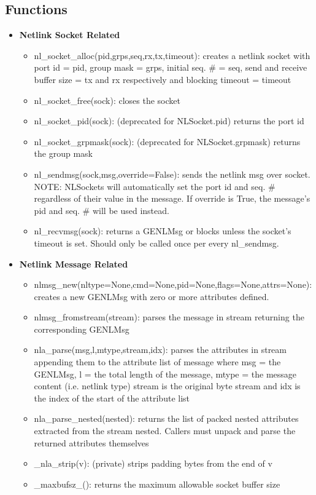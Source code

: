 \documentclass[11pt]{article}
\begin{document}
\begin{appendices}
\subsection{Functions}\label{sec:libnlfct}
\begin{itemize}
\item \textbf{Netlink Socket Related}
\begin{itemize}
\item nl\_socket\_alloc(pid,grps,seq,rx,tx,timeout): creates a netlink socket 
with port id = pid, group mask = grps, initial seq. \# = seq, send and receive
buffer size = tx and rx respectively and blocking timeout = timeout
\item nl\_socket\_free(sock): closes the socket
\item nl\_socket\_pid(sock): (deprecated for NLSocket.pid) returns the port id
\item nl\_socket\_grpmask(sock): (deprecated for NLSocket.grpmask) returns the 
group mask
\item nl\_sendmsg(sock,msg,override=False): sends the netlink msg over socket. 
NOTE: NLSockets will automatically set the port id and seq. \# regardless of 
their value in the message. If override is True, the message's pid and seq. \# 
will be used instead. 
\item nl\_recvmsg(sock): returns a GENLMsg or blocks unless the socket's timeout 
is set. Should only be called once per every nl\_sendmsg.
\end{itemize}
\item \textbf{Netlink Message Related}
\begin{itemize}
\item nlmsg\_new(nltype=None,cmd=None,pid=None,flags=None,attrs=None): creates a 
new GENLMsg with zero or more attributes defined. 
\item nlmsg\_fromstream(stream): parses the message in stream returning the
corresponding GENLMsg
\item nla\_parse(msg,l,mtype,stream,idx): parses the attributes in stream appending
them to the attribute list of message where msg = the GENLMsg, l = the total length
of the message, mtype = the message content (i.e. netlink type) stream is the
original byte stream and idx is the index of the start of the attribute list
\item nla\_parse\_nested(nested): returns the list of packed nested attributes 
extracted from the stream nested. Callers must unpack and parse the returned 
attributes themselves
\item \_nla\_strip(v): (private) strips padding bytes from the end of v
\item \_maxbufsz\_(): returns the maximum allowable socket buffer size
\end{itemize}
\end{itemize}


\end{appendices}
\end{document}
